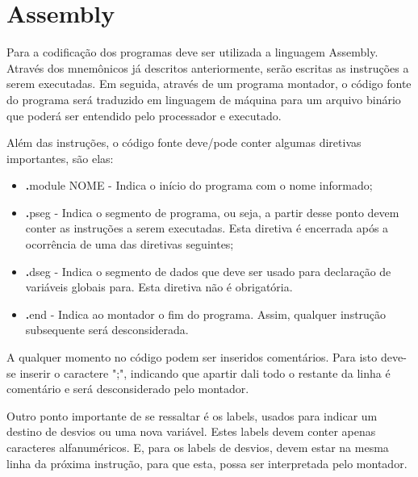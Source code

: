 \documentclass{report}
\begin{document}
\newpage
\section{Assembly}
Para a codificação dos programas deve ser utilizada a linguagem Assembly. Através dos mnemônicos já descritos anteriormente, serão escritas as instruções a serem executadas. Em seguida, através de um programa montador, o código fonte do programa será traduzido em linguagem de máquina para um arquivo binário que poderá ser entendido pelo processador e executado.\newline

Além das instruções, o código fonte deve/pode conter algumas diretivas importantes, são elas:

\begin{itemize}
\item \textbf .module NOME - Indica o início do programa com o nome informado;
\item \textbf .pseg - Indica o segmento de programa, ou seja, a partir desse ponto devem conter as instruções a serem executadas. Esta diretiva é encerrada após a ocorrência de uma das diretivas seguintes;
\item \textbf .dseg - Indica o segmento de dados que deve ser usado para declaração de variáveis globais para. Esta diretiva não é obrigatória.
\item \textbf .end - Indica ao montador o fim do programa. Assim, qualquer instrução subsequente será desconsiderada.
\end{itemize}

A qualquer momento no código podem ser inseridos comentários. Para isto deve-se inserir o caractere ";", indicando que apartir dali todo o restante da linha é comentário e será desconsiderado pelo montador.

Outro ponto importante de se ressaltar é os labels, usados para indicar um destino de desvios ou uma nova variável. Estes labels devem conter apenas caracteres alfanuméricos. E, para os labels de desvios, devem estar na mesma linha da próxima instrução, para que esta, possa ser interpretada pelo montador.
\end{document}
